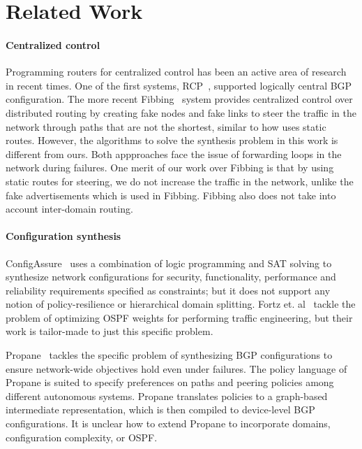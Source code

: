 \section{Related Work}\label{sec:related}
\paragraph{Centralized control} Programming routers for centralized
control has been an active area of research in recent times. One of
the first systems, RCP~\cite{rcp}, supported logically central BGP
configuration. The more recent Fibbing~\cite{fibbing} system provides
centralized control over distributed routing by creating fake nodes
and fake links to steer the traffic in the network through paths that
are not the shortest, similar to how \name uses static routes. 
However, the algorithms to solve the synthesis problem 
in this work is different from ours.  
Both appproaches face the issue of  
forwarding loops in the network during failures. 
One merit of our work over Fibbing is that by using 
static routes for steering, we do not increase the 
traffic in the network, unlike the fake advertisements 
which is used in Fibbing. Fibbing also does not take into
account inter-domain routing.



\paragraph{Configuration synthesis} 
ConfigAssure~\cite{configassure}
uses a combination of logic programming and SAT solving to synthesize
network configurations for security, 
functionality, performance and
reliability requirements specified as constraints; 
but it does not
support any notion of policy-resilience 
or hierarchical domain splitting.  Fortz
et. al~\cite{ospf-te} tackle the problem of optimizing OSPF weights
for performing traffic engineering, but their work is tailor-made
to just this specific problem.

Propane~\cite{propane} tackles the specific problem of synthesizing
BGP configurations to ensure network-wide objectives hold even under
failures. The policy language of Propane is suited to specify
preferences on paths and peering policies among different autonomous
systems. Propane translates policies
to a graph-based intermediate representation, which is then compiled
to device-level BGP configurations. It is unclear how to extend
Propane to incorporate domains, configuration complexity, or OSPF.

